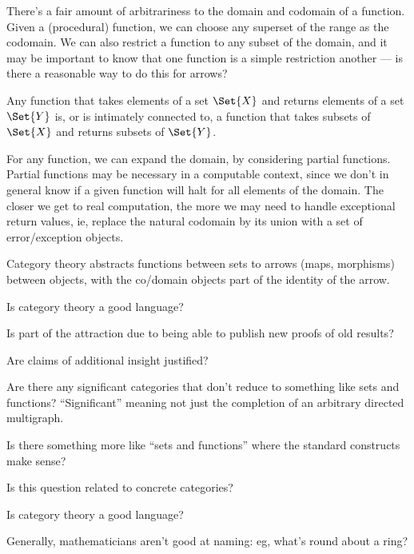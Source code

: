 \documentclass[11pt,openany]{article}
\begin{document}
There's a fair amount of arbitrariness 
to the domain and codomain of a function.
Given a (procedural) function,
we can choose any superset of the range as the codomain.
We can also restrict a function to any subset of the domain,
and it may be important to know that one function is a simple 
restriction another --- is there a reasonable way to do this
for arrows?

Any function that takes elements of a set $\Set{X}$
and returns elements of a set $\Set{Y}$
is, or is intimately connected to, 
a function that takes subsets of $\Set{X}$ and returns
subsets of $\Set{Y}$.

For any function, we can expand the domain, by considering partial
functions. 
Partial functions may be necessary in a computable context,
since we don't in general know if a given function will
halt for all elements of the domain.
The closer we get to real computation, the more we may need to
handle exceptional return values, ie, replace the natural
codomain by its union with a set of error/exception objects.

Category theory abstracts functions between sets to
arrows (maps, morphisms) between objects,
with the co/domain objects part of the identity of the arrow.

\label{sec:Right-abstraction}

Is category theory a good language?~\cite{wiki:Abstract-nonsense-2020}


Is part of the attraction due to being able to publish
new proofs of old results?

Are claims of additional insight justified?

Are there any significant categories 
that don't reduce to something like sets and functions?
``Significant'' meaning not just the completion of an arbitrary
directed multigraph.

Is there something more like ``sets and functions'' where
the standard constructs make sense?

Is this question related to concrete 
categories?~\cite{wiki:concrete-category-2020}

\label{sec:Naming}

Is category theory a good language?~\cite{wiki:Abstract-nonsense-2020}

Generally, mathematicians aren't good at naming:
eg, what's round about a ring?
\end{document}

